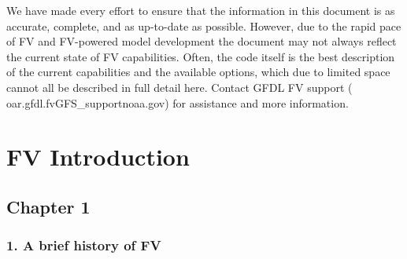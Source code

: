 We have made every effort to ensure that the information in this document is as accurate, complete, and as up-\/to-\/date as possible. However, due to the rapid pace of FV\textthreesuperior{} and FV\textthreesuperior{}-\/powered model development the document may not always reflect the current state of FV\textthreesuperior{} capabilities. Often, the code itself is the best description of the current capabilities and the available options, which due to limited space cannot all be described in full detail here. Contact G\+F\+DL FV\textthreesuperior{} support ( oar.\+gfdl.\+fv\+G\+F\+S\+\_\+supportnoaa.\+gov) for assistance and more information. \hypertarget{introduction}{}\section{FV\textthreesuperior{} Introduction}\label{introduction}
\subsection*{Chapter 1}

\subsubsection*{1. A brief history of FV\textthreesuperior{}}

